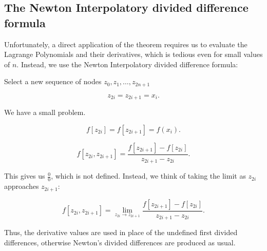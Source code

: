 \documentclass[12pt]{article}
\begin{document}
\subsection{The Newton Interpolatory divided difference formula}

Unfortunately, a direct application of the theorem requires us to evaluate the
Lagrange Polynomials and their derivatives, which is tedious even for small
values of $n$. Instead, we use the Newton Interpolatory divided difference
formula:

Select a new sequence of nodes $z_0, z_1, \dots, z_{2n+1}$ 

\[
  z_{2i} = z_{2i+1} = x_i
.\]

We have a small problem. 

\[
  f[z_{2i}] = f[z_{2i+1}] = f(x_i)
.\]

\[
  f[z_{2i}, z_{2i+1}] = \frac{f[z_{2i+1}] - f[z_{2i}]}{z_{2i+1} - z_{2i}}
.\]

This gives us $\frac{0}{0}$, which is not defined. Instead, we think of taking
the limit as $z_{2i}$ approaches $z_{2i+1}$:

\[
  f[z_{2i}, z_{2i+1}] = \lim_{z_{2i} \to z_{2i+1}} \frac{f[z_{2i+1}] - f[z_{2i}]}{z_{2i+1} - z_{2i}}
.\]


Thus, the derivative values are used in place of the undefined first divided
differences, otherwise Newton's divided differences are produced as usual.
\end{document}
